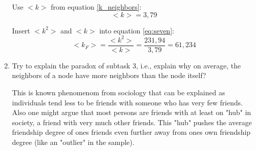 \begin{enumerate}
	Use $<k>$ from equation \ref{k_neighbors}:
	\begin{equation}
		<k> = 3,79
	\end{equation}
	
	Insert $<k^2>$ and $<k>$ into equation \ref{eq:seven}:
	\begin{equation}
		<k_F> = \frac{<k^2>}{<k>} = \frac{231,94}{3,79} = 61,234
	\end{equation}
	
	\item Try to explain the paradox of subtask 3, i.e., explain why on average, the neighbors of a node have more neighbors than the node itself?
	
	This is known phenomenom from sociology that can be explained as individuals tend less to be friends with someone who has very few friends. Also one might argue that most persons are friends with at least on "hub" in society, a friend with very much other friends. This "hub" pushes the average friendship degree of ones friends even further away from ones own friendship degree (like an "outlier" in the sample). 
		
\end{enumerate}